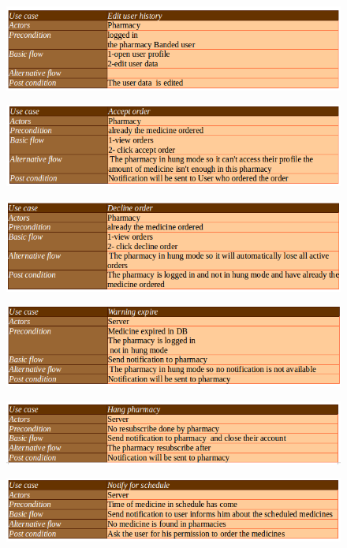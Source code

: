 \documentclass[]{article}
\begin{document}
\begin{figure}[H]
\centering
\includegraphics[scale=0.4]{./scenario/27}
\end{figure}
\begin{figure}[H]
\centering
\includegraphics[scale=0.4]{./scenario/28}
\end{figure}
\begin{figure}[H]
\centering
\includegraphics[scale=0.4]{./scenario/29}
\end{figure}
\begin{figure}[H]
\centering
\includegraphics[scale=0.4]{./scenario/30}
\end{figure}
\begin{figure}[H]
\centering
\includegraphics[scale=0.4]{./scenario/31}
\end{figure}
\begin{figure}[H]
\centering
\includegraphics[scale=0.4]{./scenario/32}
\end{figure}
\end{document}
